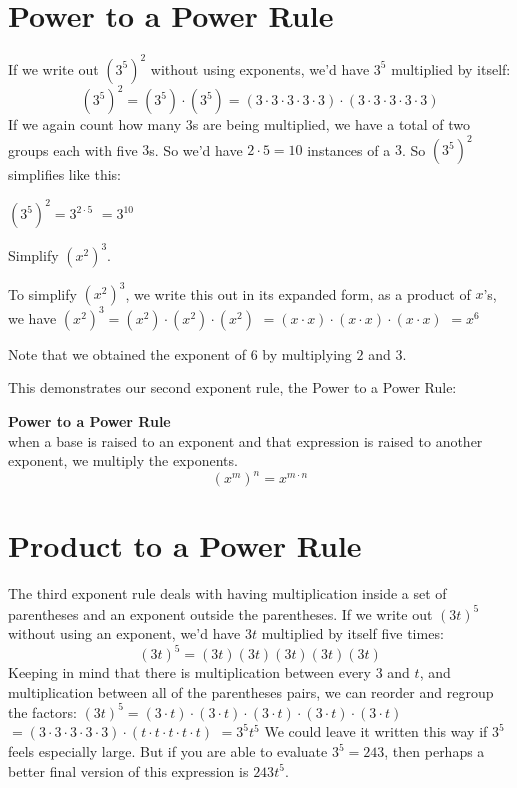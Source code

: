 \documentclass{ximera}
\begin{document}
 \section{Power to a Power Rule}

        If we write out $\left(3^5\right)^2$ without using exponents,
        we'd have $3^5$ multiplied by itself:
   $$
         \left(3^5\right)^2 = \left(3^5\right)\cdot \left(3^5\right)
         = \left(3\cdot 3\cdot 3\cdot 3 \cdot 3 \right) \cdot \left(3 \cdot 3\cdot 3\cdot 3\cdot 3\right)
      $$ 
        If we again count how many $3$s are being multiplied,
        we have a total of two groups each with five $3$s.
        So we'd have $2\cdot 5=10$ instances of a $3$.
        So $\left(3^5\right)^2$ simplifies like this:
   
          $\left(3^5\right)^2 = 3^{2\cdot 5}$
          $= 3^{10}$


\begin{example}
          Simplify $\left(x^2\right)^3$.\\
\begin{explanation}
          To simplify $\left(x^2\right)^3$,
          we write this out in its expanded form,
          as a product of $x$'s, we have
            $\left(x^2\right)^3 =\left(x^2\right) \cdot \left(x^2\right)\cdot\left(x^2\right)$
            $=(x \cdot x)\cdot (x \cdot x)\cdot (x \cdot x)$
            $=x^6$
     \end{explanation}
          Note that we obtained the exponent of $6$ by multiplying $2$ and $3$.
\end{example}
      This demonstrates our second exponent rule,
      the Power to a Power Rule:
\begin{callout}
\textbf{ \Large Power to a Power Rule} \\
      when a base is raised to an exponent and that expression is raised to another exponent,
      we multiply the exponents.
   $$
      \left(x^m\right)^n = x^{m \cdot n}
   $$
\end{callout}

      \section{ Product to a Power Rule}
        The third exponent rule deals with having multiplication inside a set of parentheses and an exponent outside the parentheses.
        If we write out $\left(3t\right)^5$ without using an exponent,
        we'd have $3t$ multiplied by itself five times:
$$
      (3t)^5= (3t)(3t)(3t)(3t)(3t)
$$
        Keeping in mind that there is multiplication between every $3$ and $t$,
        and multiplication between all of the parentheses pairs,
        we can reorder and regroup the factors:
          $\left(3t\right)^5 = (3\cdot t)\cdot (3\cdot t)\cdot (3\cdot t)\cdot (3\cdot t)\cdot (3\cdot t)$
          $= \left(3\cdot 3\cdot 3\cdot 3\cdot 3 \right) \cdot \left(t \cdot t \cdot t \cdot t \cdot t\right)$
          $= 3^5 t^5$
        We could leave it written this way if $3^5$ feels especially large.
        But if you are able to evaluate $3^5=243$,
        then perhaps a better final version of this expression is $243t^5$.
 
\end{document}
